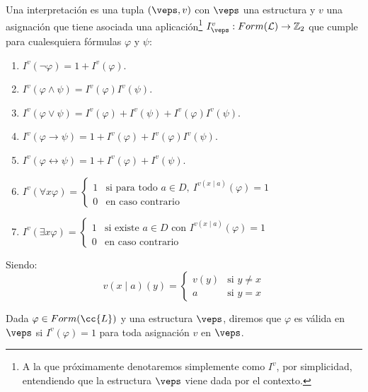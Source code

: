 \begin{definicion}[Interpretación]
    Una interpretación es una tupla $(\veps,v)$ con $\veps$ una estructura y $v$ una asignación que tiene asociada una aplicación\footnote{A la que próximamente denotaremos simplemente como $I^v$, por simplicidad, entendiendo que la estructura $\veps$ viene dada por el contexto.} $I_\veps^v:Form(\mathcal{L})\to\mathbb{Z}_2$ que cumple para cualesquiera fórmulas $\varphi$ y $\psi$:
    \begin{enumerate}
        \item $I^v(\lnot \varphi) = 1+ I^v(\varphi)$.
        \item $I^v(\varphi\land \psi) = I^v(\varphi)I^v(\psi)$.
        \item $I^v(\varphi\lor \psi) = I^v(\varphi) + I^v(\psi) + I^v(\varphi)I^v(\psi)$.
        \item $I^v(\varphi\to \psi) = 1 + I^v(\varphi) + I^v(\varphi)I^v(\psi)$.
        \item $I^v(\varphi\leftrightarrow \psi) = 1 + I^v(\varphi) + I^v(\psi)$.
        \item $I^v(\forall x\varphi) = \left\{\begin{array}{ll}
                    1 & \text{si para todo\ } a\in D,\ I^{v(x\mid a)}(\varphi) = 1 \\
                    0 & \text{en caso contrario}
        \end{array}\right.$
        \item $I^v(\exists x\varphi) = \left\{\begin{array}{ll}
                    1 & \text{si existe\ } a\in D \text{\ con\ } I^{v(x\mid a)}(\varphi) = 1 \\
                    0 & \text{en caso contrario}
        \end{array}\right.$
    \end{enumerate}
    Siendo:
    \begin{equation*}
        v(x\mid a)(y) = \left\{\begin{array}{ll}
                v(y) & \text{si\ } y\neq x \\
                a & \text{si\ } y=x
        \end{array}\right.
    \end{equation*}
\end{definicion}



\begin{definicion}
    Dada $\varphi\in Form(\cc{L})$ y una estructura $\veps$, diremos que $\varphi$ es válida en $\veps$ si $I^v(\varphi)=1$ para toda asignación $v$ en $\veps$.
\end{definicion}

